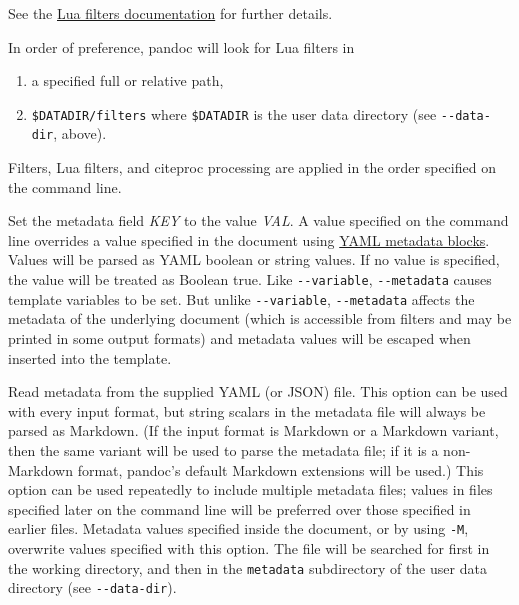 \documentclass[
  b5paper
]{book}
\begin{document}
\begin{description}
See the \href{https://pandoc.org/lua-filters.html}{Lua filters
documentation} for further details.

In order of preference, pandoc will look for Lua filters in

\begin{enumerate}
\def\labelenumi{\arabic{enumi}.}
\item
  a specified full or relative path,
\item
  \texttt{\$DATADIR/filters} where \texttt{\$DATADIR} is the user data
  directory (see \texttt{-\/-data-dir}, above).
\end{enumerate}

Filters, Lua filters, and citeproc processing are applied in the order
specified on the command line.
\item[\texttt{-M} \emph{KEY}{[}\texttt{=}\emph{VAL}{]},
\texttt{-\/-metadata=}\emph{KEY}{[}\texttt{:}\emph{VAL}{]}]
Set the metadata field \emph{KEY} to the value \emph{VAL}. A value
specified on the command line overrides a value specified in the
document using \hyperref[extension-yaml_metadata_block]{YAML metadata
blocks}. Values will be parsed as YAML boolean or string values. If no
value is specified, the value will be treated as Boolean true. Like
\texttt{-\/-variable}, \texttt{-\/-metadata} causes template variables
to be set. But unlike \texttt{-\/-variable}, \texttt{-\/-metadata}
affects the metadata of the underlying document (which is accessible
from filters and may be printed in some output formats) and metadata
values will be escaped when inserted into the template.
\item[\texttt{-\/-metadata-file=}\emph{FILE}]
Read metadata from the supplied YAML (or JSON) file. This option can be
used with every input format, but string scalars in the metadata file
will always be parsed as Markdown. (If the input format is Markdown or a
Markdown variant, then the same variant will be used to parse the
metadata file; if it is a non-Markdown format, pandoc's default Markdown
extensions will be used.) This option can be used repeatedly to include
multiple metadata files; values in files specified later on the command
line will be preferred over those specified in earlier files. Metadata
values specified inside the document, or by using \texttt{-M}, overwrite
values specified with this option. The file will be searched for first
in the working directory, and then in the \texttt{metadata} subdirectory
of the user data directory (see \texttt{-\/-data-dir}).
\item[\texttt{-p}, \texttt{-\/-preserve-tabs{[}=true\textbar{}false{]}}]

\end{description}
\end{document}
